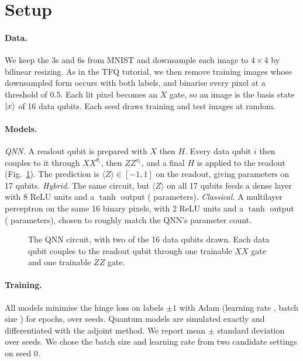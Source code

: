 \section{Setup}
\label{sec:setup}

\paragraph{Data.}
We keep the 3s and 6s from MNIST \citep{lecun1998mnist} and downsample each image to $4\times4$ by
bilinear resizing. As in the TFQ tutorial, we then remove training images whose downsampled form occurs
with both labels, and binarise every pixel at a threshold of 0.5. Each lit pixel becomes an $X$ gate,
so an image is the basis state $\lvert x\rangle$ of 16 data qubits. Each seed draws \valMnistNTrain{} training
and \valMnistNTest{} test images at random.

\paragraph{Models.}
\emph{QNN.} A readout qubit is prepared with $X$ then $H$. Every data qubit $i$ then couples to it
through $XX^{\theta_i}$, then $ZZ^{\phi_i}$, and a final $H$ is applied to the readout
(Fig.~\ref{fig:circuit}). The prediction is $\langle Z\rangle\in[-1,1]$ on the readout, giving
\valQnnParams{} parameters on 17 qubits. \emph{Hybrid.} The same circuit, but $\langle Z\rangle$ on all
17 qubits feeds a dense layer with 8 ReLU units and a $\tanh$ output (\valHybridParams{} parameters).
\emph{Classical.} A multilayer perceptron on the same 16 binary pixels, with 2 ReLU units and a $\tanh$
output (\valClassicalParams{} parameters), chosen to roughly match the QNN's parameter count.

\begin{figure}[t]
\centering

\caption{The QNN circuit, with two of the 16 data qubits drawn. Each data qubit couples to the
readout qubit through one trainable $XX$ gate and one trainable $ZZ$ gate.}
\label{fig:circuit}
\end{figure}

\paragraph{Training.}
All models minimise the hinge loss on labels $\pm1$ with Adam \citep{kingma2014adam} (learning rate
\valMnistLr{}, batch size \valMnistBatch{}) for \valMnistEpochs{} epochs, over \valMnistSeeds{} seeds.
Quantum models are simulated exactly and differentiated with the adjoint method. We report mean
$\pm$ standard deviation over seeds. We chose the batch size and learning rate from two candidate
settings on seed 0.

